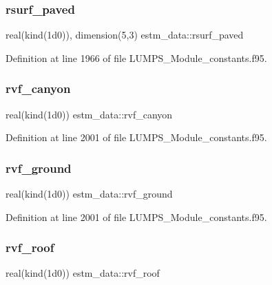 \subsubsection{\texorpdfstring{rsurf\+\_\+paved}{rsurf\_paved}}
{\footnotesize\ttfamily real(kind(1d0)), dimension(5,3) estm\+\_\+data\+::rsurf\+\_\+paved}



Definition at line 1966 of file L\+U\+M\+P\+S\+\_\+\+Module\+\_\+constants.\+f95.

\mbox{\label{namespaceestm__data_aee07cb5c857d8a1e88758c8917f30a9d}} 
\subsubsection{\texorpdfstring{rvf\+\_\+canyon}{rvf\_canyon}}
{\footnotesize\ttfamily real(kind(1d0)) estm\+\_\+data\+::rvf\+\_\+canyon}



Definition at line 2001 of file L\+U\+M\+P\+S\+\_\+\+Module\+\_\+constants.\+f95.

\mbox{\label{namespaceestm__data_a92e6dde87beb4b135989c014c954724d}} 
\subsubsection{\texorpdfstring{rvf\+\_\+ground}{rvf\_ground}}
{\footnotesize\ttfamily real(kind(1d0)) estm\+\_\+data\+::rvf\+\_\+ground}



Definition at line 2001 of file L\+U\+M\+P\+S\+\_\+\+Module\+\_\+constants.\+f95.

\mbox{\label{namespaceestm__data_a3501ea07273d6456cdc4fedd9b771d6d}} 
\subsubsection{\texorpdfstring{rvf\+\_\+roof}{rvf\_roof}}
{\footnotesize\ttfamily real(kind(1d0)) estm\+\_\+data\+::rvf\+\_\+roof}



